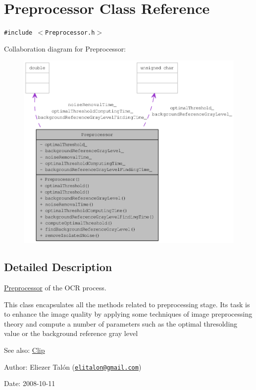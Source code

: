 \hypertarget{class_preprocessor}{
\section{Preprocessor Class Reference}
\label{class_preprocessor}
}
{\tt \#include $<$Preprocessor.h$>$}

Collaboration diagram for Preprocessor:\nopagebreak
\begin{figure}[H]
\begin{center}
\leavevmode
\includegraphics[width=400pt]{class_preprocessor__coll__graph}
\end{center}
\end{figure}


\subsection{Detailed Description}
\hyperlink{class_preprocessor}{Preprocessor} of the OCR process. 

This class encapsulates all the methods related to preprocessing stage. Its task is to enhance the image quality by applying some techniques of image preprocessing theory and compute a number of parameters such as the optimal thresolding value or the background reference gray level

\begin{Desc}
\item[See also:]\hyperlink{class_clip}{Clip}\end{Desc}
\begin{Desc}
\item[Author:]Eliezer Talón (\href{mailto:elitalon@gmail.com}{\tt elitalon@gmail.com}) \end{Desc}
\begin{Desc}
\item[Date:]2008-10-11 \end{Desc}


